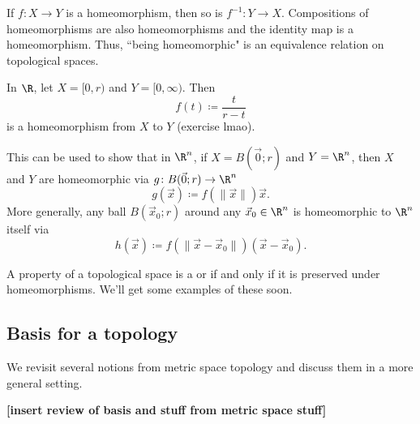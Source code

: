 \documentclass[class=article, crop=false]{standalone}
\begin{document}

\begin{rem}
  If $f \colon X \to Y$ is a homeomorphism, then so is $f^{-1} \colon Y \to X$. Compositions of homeomorphisms are also homeomorphisms and the identity map is a homeomorphism. Thus, ``being homeomorphic" is an equivalence relation on topological spaces.
\end{rem}

\begin{ex}
  In $\R$, let $X = [0,r)$ and $Y=[0,\infty)$. Then
    \[
      f(t) \coloneqq \frac{t}{r-t}
    \]
  is a homeomorphism from $X$ to $Y$ (exercise lmao).

  This can be used to show that in $\R^n$, if $X = B(\vec 0;r)$ and $Y=\R^n$, then $X$ and $Y$ are homeomorphic via $g\colon B(\vec 0;r) \to \R^n$
    \[
      g(\vec x) \coloneqq f(\|\vec x\|) \vec x.
    \]
  More generally, any ball $B(\vec x_0 ;r)$ around any $\vec x_0 \in \R^n$ is homeomorphic to $\R^n$ itself via
    \[
      h(\vec x) \coloneqq f(\|\vec x - \vec x_0\|) (\vec x - \vec x_0).
    \]
\end{ex}

\begin{rem}
  A property of a topological space is a  or  if and only if it is preserved under homeomorphisms. We'll get some examples of these soon.
\end{rem}









\subsection{Basis for a topology}

We revisit several notions from metric space topology and discuss them in a more general setting.

\textbf{[insert review of basis and stuff from metric space stuff]}
\end{document}
